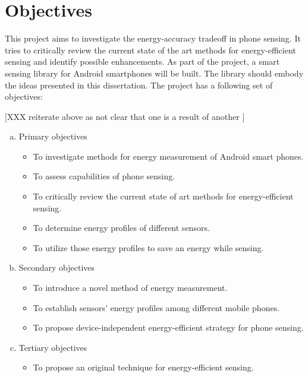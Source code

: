 \section{Objectives}
\label{s:objectives}
\hspace{10pt} This project aims to investigate the energy-accuracy tradeoff in phone sensing. It tries to critically review the current state of the art methods for energy-efficient sensing and identify possible enhancements. As part of the project, a smart sensing library for Android smartphones will be built. The library should embody the ideas presented in this dissertation. The project has a following set of objectives:
 
[XXX reiterate above as not clear that one is a result of another ]\\


\begin{enumerate}[(a)]
 \item Primary objectives
  \begin{itemize}
  	\item To investigate methods for energy measurement of Android smart phones.
  	\item To assess capabilities of phone sensing.
  	\item To critically review the current state of art methods for energy-efficient sensing.
  	\item To determine energy profiles of different sensors.
  	\item To utilize those energy profiles to save an energy while sensing.
  \end{itemize}
  \item Secondary objectives
  \begin{itemize}
    \item To introduce a novel method of energy measurement.
  	\item To establish sensors' energy profiles among different mobile phones.
  	\item To propose device-independent energy-efficient strategy for phone sensing.
  \end{itemize}
  \item Tertiary objectives
  \begin{itemize}
   \item To propose an original technique for energy-efficient sensing.
  \end{itemize}
\end{enumerate}